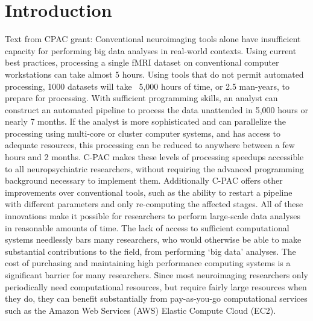 \documentclass[1p,11pt]{elsarticle}
\begin{document}
\maketitle

\sloppy %

\section{Introduction}

Text from CPAC grant: 
Conventional neuroimaging tools alone have insufficient capacity for
performing big data analyses in real-world contexts. Using current best
practices, processing a single fMRI dataset on conventional computer
workstations can take almost 5 hours. Using tools that do not permit
automated processing, 1000 datasets will take ~5,000 hours of time, or
2.5 man-years, to prepare for processing. With sufficient programming
skills, an analyst can construct an automated pipeline to process the
data unattended in 5,000 hours or nearly 7 months. If the analyst is
more sophisticated and can parallelize the processing using multi-core
or cluster computer systems, and has access to adequate resources, this
processing can be reduced to anywhere between a few hours and 2 months.
C-PAC makes these levels of processing speedups accessible to all
neuropsychiatric researchers, without requiring the advanced programming
background necessary to implement them. Additionally C-PAC offers other
improvements over conventional tools, such as the ability to restart a
pipeline with different parameters and only re-computing the affected
stages. All of these innovations make it possible for researchers to
perform large-scale data analyses in reasonable amounts of time.  The
lack of access to sufficient computational systems needlessly bars many
researchers, who would otherwise be able to make substantial
contributions to the field, from performing ‘big data’ analyses. The
cost of purchasing and maintaining high performance computing systems is
a significant barrier for many researchers. Since most neuroimaging
researchers only periodically need computational resources, but require
fairly large resources when they do, they can benefit substantially from
pay-as-you-go computational services such as the Amazon Web Services
(AWS) Elastic Compute Cloud (EC2). 
\end{document}
